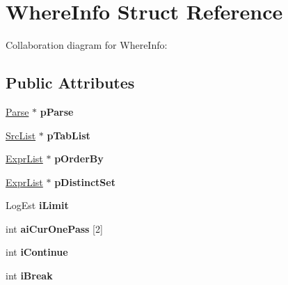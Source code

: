 \hypertarget{structWhereInfo}{}\section{Where\+Info Struct Reference}
\label{structWhereInfo}


Collaboration diagram for Where\+Info\+:
\subsection*{Public Attributes}
\begin{DoxyCompactItemize}
\item 
\hyperlink{structParse}{Parse} $\ast$ {\bfseries p\+Parse}\hypertarget{structWhereInfo_a26745055cd13360536fb4b074db358f9}{}\label{structWhereInfo_a26745055cd13360536fb4b074db358f9}

\item 
\hyperlink{structSrcList}{Src\+List} $\ast$ {\bfseries p\+Tab\+List}\hypertarget{structWhereInfo_a0f43432aeca75640c96a69f6a82aa138}{}\label{structWhereInfo_a0f43432aeca75640c96a69f6a82aa138}

\item 
\hyperlink{structExprList}{Expr\+List} $\ast$ {\bfseries p\+Order\+By}\hypertarget{structWhereInfo_a7d15fd39a32b8324e03b1c0b1db991a2}{}\label{structWhereInfo_a7d15fd39a32b8324e03b1c0b1db991a2}

\item 
\hyperlink{structExprList}{Expr\+List} $\ast$ {\bfseries p\+Distinct\+Set}\hypertarget{structWhereInfo_aecab54f1a492952f481af2f6ba79fbe1}{}\label{structWhereInfo_aecab54f1a492952f481af2f6ba79fbe1}

\item 
Log\+Est {\bfseries i\+Limit}\hypertarget{structWhereInfo_a82f5ecf90452501ef3319b061723002d}{}\label{structWhereInfo_a82f5ecf90452501ef3319b061723002d}

\item 
int {\bfseries ai\+Cur\+One\+Pass} \mbox{[}2\mbox{]}\hypertarget{structWhereInfo_a77e2c29eafad2f964cb36245f38178eb}{}\label{structWhereInfo_a77e2c29eafad2f964cb36245f38178eb}

\item 
int {\bfseries i\+Continue}\hypertarget{structWhereInfo_a5b8eb73a6a5bba7ef126b9de13ee8537}{}\label{structWhereInfo_a5b8eb73a6a5bba7ef126b9de13ee8537}

\item 
int {\bfseries i\+Break}\hypertarget{structWhereInfo_a338ac73b84c81db455ad7db56b5e4a06}{}\label{structWhereInfo_a338ac73b84c81db455ad7db56b5e4a06}


\end{DoxyCompactItemize}
